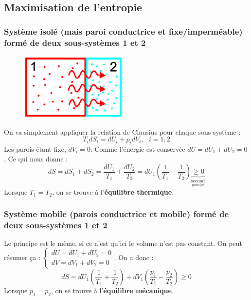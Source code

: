 \documentclass[british,french,11pt, a4paper, openany]{book}
\begin{document}
	\subsection{Maximisation de l'entropie}
	\subsubsection{Système isolé (mais paroi conductrice et fixe/imperméable) formé de deux sous-systèmes 1  et 2}
	\begin{figure}
		\includegraphics[scale=0.5]{cp/image3.png}
	\end{figure}
	On va simplement appliquer la relation de Clausius pour chaque sous-système :
	\begin{equation}
	T_idS_i = dU_i + p_idV_i, \ \ \ i= 1,2
	\end{equation}
	Les parois étant fixe, $dV_i = 0$. Comme l'énergie est conservée $dU = dU_1 +dU_2 = 0$. Ce qui nous donne : 
	\begin{equation}
	dS = dS_1+dS_2 = \frac{dU_1}{T_1} + \frac{dU_2}{T_2} = dU_1\left(\frac{1}{T_1} - \frac{1}{T_2}\right) \underbrace{\geq 0}_{\underset{\text{principe}}{\text{second}}}
	\end{equation}
	Lorsque $T_1 = T_2$, on se trouve à l'\textbf{équilibre thermique}.
	
	\subsubsection{Système mobile (parois conductrice et mobile) formé de deux sous-systèmes 1 et 2}
	Le principe est le même, si ce n'est qu'ici le volume n'est pas constant. On peut résumer ça : $\left\{\begin{array}{l}
	dU = dU_1 + dU_2 = 0\\
	dV = dV_1 + dV_2 = 0
	\end{array}\right.$. On a donc :
	\begin{equation}
	dS = dU_1\left(\frac{1}{T_1}+\frac{1}{T_2}\right) + dV_1\left(\frac{p_1}{T_1} - \frac{p_2}{T_2}\right)  \geq 0
	\end{equation}
	Lorsque $p_1 = p_2$, on se trouve à l'\textbf{équilibre mécanique}.
	
\end{document}
